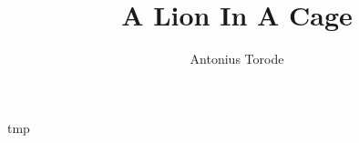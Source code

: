 \documentclass[10pt]{article}
\title{A Lion In A Cage}
\author{Antonius Torode}
\begin{document}
\maketitle
\thispagestyle{fancy}

\begin{multicols}{2}



\begin{thebibliography}{9}
	{\footnotesize
	 tmp

	}
\end{thebibliography}

\end{multicols}


\end{document}
